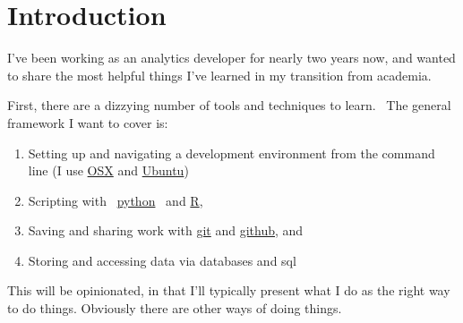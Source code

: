\section{Introduction}
I've been working as an analytics developer for nearly two years now, and wanted 
to share the most helpful things I've learned in my transition from academia.

First, there are a dizzying number of tools and techniques to learn.  The general
framework I want to cover is:
\begin{enumerate}
  \item Setting up and navigating a development environment from the command line 
    (I use \href{https://www.apple.com/osx/}{OSX} and 
    \href{http://www.ubuntu.com/}{Ubuntu})
  \item Scripting with 
  \href{http://www.python.org/}{python} 
  and 
    \href{http://www.r-project.org/}{R},
  \item Saving and sharing work with \href{http://git-scm.com/}{git} 
    and \href{https://github.com/}{github}, and
  \item Storing and accessing data via databases and sql
\end{enumerate}

This will be opinionated, in that I'll typically present what I do as the right way 
to do things. Obviously there are other ways of doing things.
